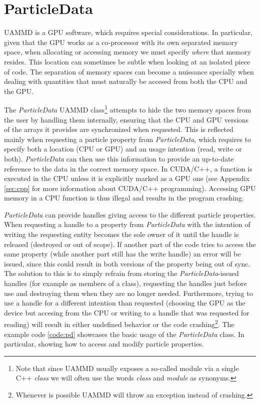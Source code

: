 \documentclass[ twoside,openright,titlepage,numbers=noenddot,%
headinclude,footinclude,cleardoublepage=empty,abstract=on,
BCOR=5mm,paper=a4,fontsize=11pt, dvipsnames
]{scrreprt}
\newcommand{\uammd}{\gls{UAMMD}\xspace}
\newcommand{\gpu}{\gls{GPU}\xspace}
\begin{document}
\section{ParticleData}\label{sec:particledata}
\uammd is a \gpu software, which requires special considerations. In particular, given that the \gpu works as a co-processor with its own separated memory space, when allocating or accessing memory we must specify \emph{where} that memory resides. This location can sometimes be subtle when looking at an isolated piece of code. The separation of memory spaces can become a nuissance specially when dealing with quantities that must naturally be accesed from both the CPU and the \gpu.

The \emph{ParticleData} \uammd class\footnote{Note that since \uammd usually exposes a so-called module via a single C++ \emph{class} we will often use the words \emph{class} and \emph{module} as synonyms.} attempts to hide the two memory spaces from the user by handling them internally, ensuring that the CPU and \gpu versions of the arrays it provides are synchronized when requested. This is reflected mainly when requesting a particle property from \emph{ParticleData}, which requires to specify both a location (CPU or \gpu) and an usage intention (read, write or both). \emph{ParticleData} can then use this information to provide an up-to-date reference to the data in the correct memory space.
In CUDA/C++, a function is executed in the CPU unless it is explicitly marked as a \gpu one (see Appendix \ref{sec:cpp} for more information about CUDA/C++ programming). Accessing \gpu memory in a CPU function is thus illegal and results in the program crashing.

\emph{ParticleData} can provide handles giving access to the different particle properties.
When requesting a handle to a property from \emph{ParticleData} with the intention of writing the requesting entity becomes the sole owner of it until the handle is released (destroyed or out of scope). If another part of the code tries to access the same property (while another part still has the write handle) an error will be issued, since this could result in both versions of the property being out of sync. The solution to this is to simply refrain from storing the \emph{ParticleData}-issued handles (for example as members of a class), requesting the handles just before use and destroying them when they are no longer needed. Furthermore, trying to use a handle for a different intention than requested (choosing the GPU as the device but accesing from the CPU or writing to a handle that was requested for reading) will result in either undefined behavior or the code crashing\footnote{Whenever is possible \uammd will throw an exception instead of crashing.}. The example code \ref{code:pd} showcases the basic usage of the \emph{ParticleData} class. In particular, showing how to access and modify particle properties.
\end{document}
